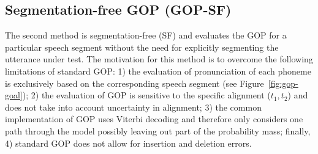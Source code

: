 \subsection{Segmentation-free GOP (GOP-SF)}
\label{sec:gop-segmentation-free}
The second method is segmentation-free (SF) and evaluates the GOP for a particular speech segment without the need for explicitly segmenting the utterance under test.
The motivation for this method is to overcome the following limitations of standard GOP:
1) the evaluation of pronunciation of each phoneme is exclusively based on the corresponding speech segment (see Figure~\ref{fig:gop-goal});
2) the evaluation of GOP is sensitive to the specific alignment ($t_1,t_2$) and does not take into account uncertainty in alignment;
3) the common implementation of GOP uses Viterbi decoding and therefore only considers one path through the model possibly leaving out part of the probability mass; finally,
4) standard GOP does not allow for insertion and deletion errors.

